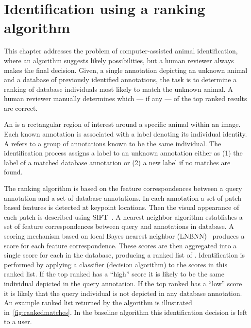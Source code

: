 \begin{comment}
    ./texfix.py --fpaths chapter3-matching.tex --outline --asmarkdown --numlines=999 -w
    ./texfix.py --fpaths chapter3-matching.tex --outline --asmarkdown --numlines=999 -w
    ./texfix.py --fpaths chapter3-matching.tex --reformat 
    # http://jaxedit.com/mark/
\end{comment}

\chapter{Identification using a ranking algorithm}\label{chap:ranking}

    This chapter addresses the problem of computer-assisted animal identification, where an algorithm suggests
      likely possibilities, but a human reviewer always makes the final decision.
    Given, a single annotation depicting an unknown animal and a database of previously identified annotations,
      the task is to determine a ranking of database individuals most likely to match the unknown animal.
    A human reviewer manually determines which --- if any --- of the top ranked results are correct.

    An  is a rectangular region  of interest around a specific animal within an image. Each
    known annotation is associated with a \name{} label denoting its individual identity. A \glossterm{\name{}}
    refers to a group of annotations known to be the same individual. The identification process assigns a \name{}
    label to an unknown annotation either as (1) the \name{} label of a matched database annotation or (2) a new
    \name{} label if no matches are found.

    The ranking algorithm is based on the feature correspondences between a query annotation and a set of database
    annotations. In each annotation a set of patch-based features is detected at keypoint locations. Then the
    visual appearance of each patch is described using SIFT~\cite{lowe_distinctive_2004}. A nearest neighbor
    algorithm establishes a set of feature correspondences between query and annotations in database. A scoring
    mechanism based on local \naive{} Bayes nearest neighbor (LNBNN)~\cite{mccann_local_2012} produces a score for
    each feature correspondence. These scores are then aggregated into a single score for each \name{} in the
    database, producing a ranked list of \names{}. Identification is performed by applying a classifier (decision
    algorithm) to the scores in this ranked list. If the top ranked \name{} has a ``high'' score it is likely to be
    the same individual depicted in the query annotation. If the top ranked \name{} has a ``low'' score it is
    likely that the query individual is not depicted in any database annotation. An example ranked list returned by
    the algorithm is illustrated in~\cref{fig:rankedmatches}. In the baseline algorithm this identification
    decision is left to a user.

